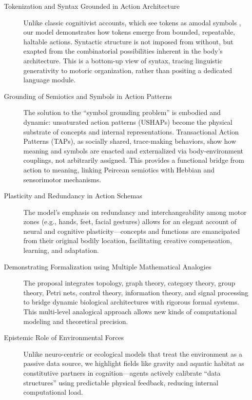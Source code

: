 \begin{description}
    \item[Tokenization and Syntax Grounded in Action Architecture]
    Unlike classic cognitivist accounts, which see tokens as amodal symbols \cite{fodor1975language, pylyshyn1984computation}, our model demonstrates how tokens emerge from bounded, repeatable, haltable actions. Syntactic structure is not imposed from without, but exapted from the combinatorial possibilities inherent in the body's architecture. This is a bottom-up view of syntax, tracing linguistic generativity to motoric organization, rather than positing a dedicated language module.
    \item[Grounding of Semiotics and Symbols in Action Patterns]
    The solution to the “symbol grounding problem” is embodied and dynamic: unsaturated action patterns (USHAPs) become the physical substrate of concepts and internal representations. Transactional Action Patterns (TAPs), as socially shared, trace-making behaviors, show how meaning and symbols are enacted and externalized via body-environment couplings, not arbitrarily assigned. This provides a functional bridge from action to meaning, linking Peircean semiotics with Hebbian \cite{hebb1949organisation} and sensorimotor mechanisms.

    \item[Plasticity and Redundancy in Action Schemas]
    The model’s emphasis on redundancy and interchangeability among motor zones (e.g., hands, feet, facial gestures) allows for an elegant account of neural and cognitive plasticity—concepts and functions are emancipated from their original bodily location, facilitating creative compensation, learning, and adaptation.

    \item[Demonstrating Formalization using Multiple Mathematical Analogies] 
    The proposal integrates topology, graph theory, category theory, group theory, Petri nets, control theory, information theory, and signal processing to bridge dynamic biological architectures with rigorous formal systems. This multi-level analogical approach allows new kinds of computational modeling and theoretical precision.

    \item[Epistemic Role of Environmental Forces]
    Unlike neuro-centric or ecological models that treat the environment as a passive data source, we highlight fields like gravity and aquatic habitat as constitutive partners in cognition—agents actively calibrate “data structures” using predictable physical feedback, reducing internal computational load.


\end{description}
